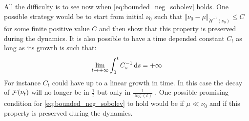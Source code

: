 All the difficulty is to see now when \cref{eq:bounded_neg_sobolev} holds. One possible strategy would be to start from initial $\nu_0$ such that $\Vert \nu_0  - \mu \Vert_{\dot{H}^{-1}(\nu_0)} \leq C $  for some finite positive value $C$ and then show that this property is preserved during the dynamics. It is also possible to have a time depended constant $C_t$ as long as its growth is such that:
\begin{align}
	\lim_{t\rightarrow +\infty} \int_0^t C_s^{-1}\mathop{}\!\mathrm{d} s = +\infty
\end{align}
For instance $C_t$ could have up to a linear growth in time. In this case the decay of ${{\mathcal F}}(\nu_t)$ will no longer be in $\frac{1}{t}$ but only in $\frac{1}{\log(t)}$ .
One possible promising condition for \cref{eq:bounded_neg_sobolev} to hold would be if $\mu \ll \nu_0$ and if this property is preserved during the dynamics.


 
 
 